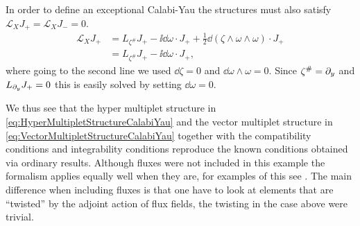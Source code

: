 In order to define an exceptional Calabi-Yau the structures must also satisfy $\mathscr{L}_XJ_+=\mathscr{L}_XJ_-=0$.
\begin{equation}
    \begin{aligned}
    \mathscr{L}_X J_+ &= L_{\zeta^{\#}}J_+-\ii\dd\omega\cdot J_++\frac{1}{2}\dd(\zeta\wedge\omega\wedge\omega)\cdot J_+\\
    &= L_{\zeta^{\#}}J_+-\ii\dd\omega\cdot J_+,
    \end{aligned}
\end{equation}
where going to the second line we used $\dd\zeta=0$ and $\dd\omega\wedge\omega=0$. Since $\zeta^{\#}=\partial_y$ and $L_{\partial_y}J_+=0$ this is easily solved by setting $\dd\omega=0$. 

We thus see that the hyper multiplet structure in \eqref{eq:HyperMultipletStructureCalabiYau} and the vector multiplet structure in \eqref{eq:VectorMultipletStructureCalabiYau} together with the compatibility conditions and integrability conditions reproduce the known conditions obtained via ordinary results. Although fluxes were not included in this example the formalism applies equally well when they are, for examples of this see \cite{Ashmore:2015joa,Ashmore:2016qvs}. The main difference when including fluxes is that one have to look at elements that are ``twisted'' by the adjoint action of flux fields, the twisting in the case above were trivial. 












